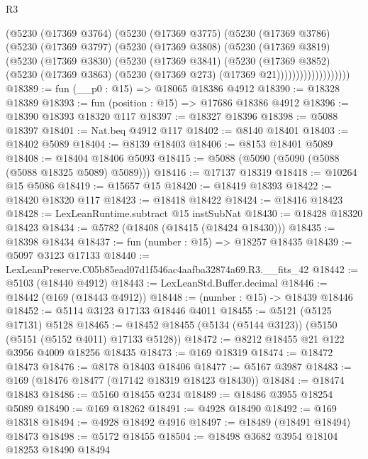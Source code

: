 \begin{lexlean}{R3}
\begin{coremodule}
                  (@5230
                    (@17369 @3764)
                    (@5230
                      (@17369 @3775)
                      (@5230
                        (@17369 @3786)
                        (@5230
                          (@17369 @3797)
                          (@5230
                            (@17369 @3808)
                            (@5230
                              (@17369 @3819)
                              (@5230
                                (@17369 @3830)
                                (@5230
                                  (@17369 @3841)
                                  (@5230
                                    (@17369 @3852)
                                    (@5230
                                      (@17369 @3863)
                                      (@5230 (@17369 @273) (@17369 @21)))))))))))))))))))
@18389 := fun (__p0 : @15) => @18065 @18386 @4912
@18390 := @18328 @18389
@18393 := fun (position : @15) => @17686 @18386 @4912
@18396 := @18390 @18393 @18320 @117
@18397 := @18327 @18396
@18398 := @5088 @18397
@18401 := Nat.beq @4912 @117
@18402 := @8140 @18401
@18403 := @18402 @5089
@18404 := @8139 @18403
@18406 := @8153 @18401 @5089
@18408 := @18404 @18406 @5093
@18415 := @5088 (@5090 (@5090 (@5088 (@5088 @18325 @5089) @5089)))
@18416 := @17137 @18319
@18418 := @10264 @15 @5086
@18419 := @15657 @15
@18420 := @18419 @18393
@18422 := @18420 @18320 @117
@18423 := @18418 @18422
@18424 := @18416 @18423
@18428 := LexLeanRuntime.subtract @15 instSubNat
@18430 := @18428 @18320 @18423
@18434 := @5782 (@18408 (@18415 (@18424 @18430)))
@18435 := @18398 @18434
@18437 := fun (number : @15) => @18257 @18435
@18439 := @5097 @3123 @17133
@18440 := LexLeanPreserve.C05b85ead07d1f546ac4aafba32874a69.R3.__fits_42
@18442 := @5103 (@18440 @4912)
@18443 := LexLeanStd.Buffer.decimal
@18446 := @18442 (@169 (@18443 @4912))
@18448 := (number : @15) -> @18439 @18446
@18452 := @5114 @3123 @17133 @18446 @4011
@18455 := @5121 (@5125 @17131) @5128
@18465 := @18452 @18455 (@5134 (@5144 @3123)) (@5150 (@5151 (@5152 @4011) @17133 @5128))
@18472 := @8212 @18455 @21 @122 @3956 @4009 @18256 @18435
@18473 := @169 @18319
@18474 := @18472 @18473
@18476 := @8178 @18403 @18406
@18477 := @5167 @3987
@18483 := @169 (@18476 @18477 (@17142 @18319 @18423 @18430))
@18484 := @18474 @18483
@18486 := @5160 @18455 @234
@18489 := @18486 @3955 @18254 @5089
@18490 := @169 @18262
@18491 := @4928 @18490
@18492 := @169 @18318
@18494 := @4928 @18492 @4916
@18497 := @18489 (@18491 @18494) @18473
@18498 := @5172 @18455
@18504 := @18498 @3682 @3954 @18104 @18253 @18490 @18494

\end{coremodule}
\end{lexlean}
